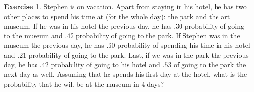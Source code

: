 \documentclass[letterpaper]{article}
\theoremstyle{definition}
\theoremstyle{remark}
\theoremstyle{definition}
\newtheorem{exercise}[thm]{Exercise}
\begin{document}
\begin{exercise}
    Stephen is on vacation. Apart from staying in his hotel, he has two other places to spend his time at (for the whole day): the park and the art museum. If he was in his hotel the previous day, he has $.30$ probability of going to the museum and $.42$ probability of going to the park. If Stephen was in the museum the previous day, he has $.60$ probability of spending his time in his hotel and $.21$ probability of going to the park. Last, if we was in the park the previous day, he has $.42$ probability of going to his hotel and $.53$ of going to the park the next day as well. Assuming that he spends his first day at the hotel, what is the probability that he will be at the museum in $4$ days?
\end{exercise}
\end{document}
